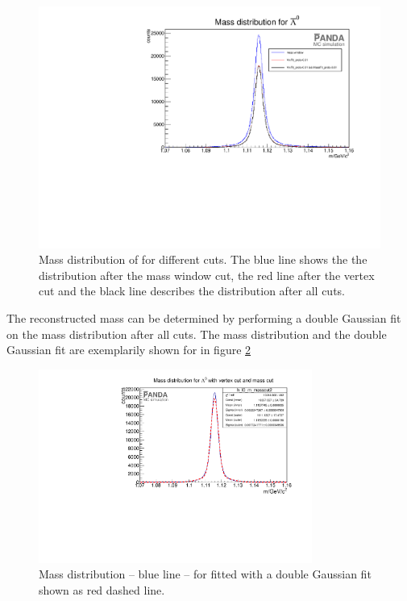 		\begin{figure}
			\centering
				\includegraphics[width=1.1\textwidth]{./plots/antilambda0/antiLambda0_m_diffcuts.pdf}
			\caption{\propose Mass distribution of \alam for different cuts. The blue line shows the the distribution after the mass window cut, the red 
					line after the vertex cut and the black line describes the distribution after all cuts.}
			\label{fig:antilambda0_massdiffcuts}
		\end{figure}
		
		The reconstructed mass can be determined by performing a double Gaussian fit on the mass distribution after all cuts.
		The mass distribution and the double Gaussian fit are exemplarily shown for \lam in figure \ref{fig:lambda0_massfit}
		
		\begin{figure}
			\centering
				\includegraphics[width=0.8\textwidth]{./plots/lambda0/lambda0_m_masscut2.pdf}
			\caption{\propose Mass distribution -- blue line -- for \lam fitted with a double Gaussian fit shown as red dashed line.}
			\label{fig:lambda0_massfit}
		\end{figure}
		
